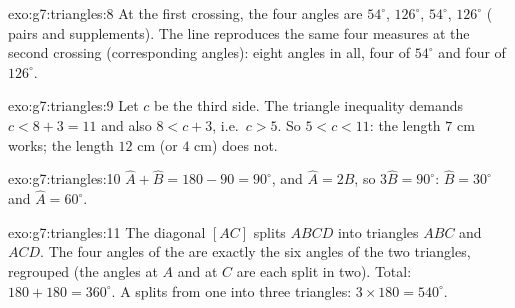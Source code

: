 \begin{solution}{exo:g7:triangles:8}
At the first crossing, the four angles are $54^\circ$, $126^\circ$,
$54^\circ$, $126^\circ$ ( pairs and supplements).
The  line reproduces the same four measures at the second
crossing (corresponding angles): eight angles in all, four of
$54^\circ$ and four of $126^\circ$.
\end{solution}

\begin{solution}{exo:g7:triangles:9}
Let $c$ be the third side. The triangle inequality demands
$c < 8 + 3 = 11$ and also $8 < c + 3$, i.e.\ $c > 5$. So
$5 < c < 11$: the length $7$ cm works; the length $12$ cm (or $4$ cm)
does not.
\end{solution}

\begin{solution}{exo:g7:triangles:10}
$\widehat A + \widehat B = 180 - 90 = 90^\circ$, and
$\widehat A = 2\widehat B$, so $3\widehat B = 90^\circ$:
$\widehat B = 30^\circ$ and $\widehat A = 60^\circ$.
\end{solution}

\begin{solution}{exo:g7:triangles:11}
The diagonal $[AC]$ splits $ABCD$ into triangles $ABC$ and $ACD$.
The four angles of the  are exactly the six angles of
the two triangles, regrouped (the angles at $A$ and at $C$ are each
split in two). Total: $180 + 180 = 360^\circ$. A  splits from
one  into three triangles: $3 \times 180 = 540^\circ$.
\end{solution}

